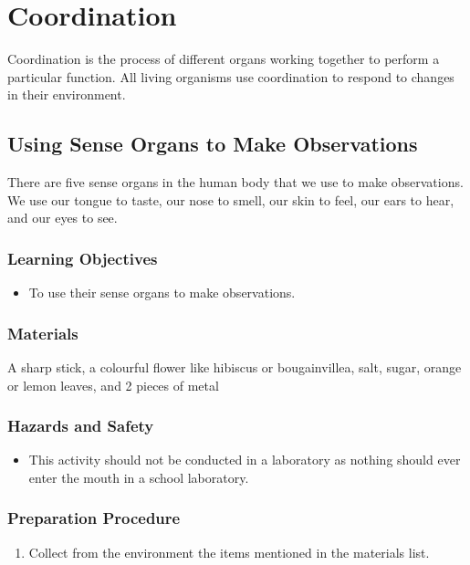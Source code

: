 \section{Coordination}
Coordination is the process of different organs working together to perform a particular function. All living organisms use coordination to respond to changes in their environment.

\subsection{Using Sense Organs to Make Observations}
There are five sense organs in the human body that we use to make observations. We use our tongue to taste, our nose to smell, our skin to feel, our ears to hear, and our eyes to see.

\subsubsection*{Learning Objectives}
\begin{itemize}
\item{To use their sense organs to make observations.}
\end{itemize}

\subsubsection*{Materials}
A sharp stick, a colourful flower like hibiscus or bougainvillea, salt, sugar, orange or lemon leaves, and 2 pieces of metal

\subsubsection*{Hazards and Safety}
\begin{itemize}
\item{This activity should not be conducted in a laboratory as nothing should ever enter the mouth in a school laboratory.}
\end{itemize}

\subsubsection*{Preparation Procedure}
\begin{enumerate}
\item{Collect from the environment the items mentioned in the materials list.}
\end{enumerate}

